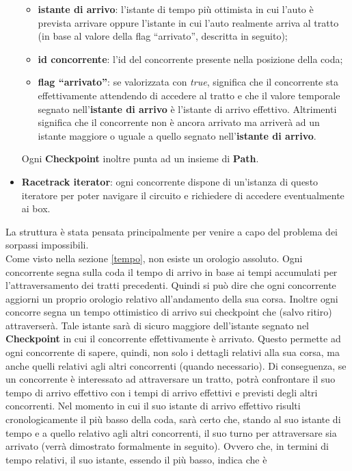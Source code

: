 \begin{itemize}
\begin{itemize}
\item \textbf{istante di arrivo}: l'istante di tempo più ottimista in cui l'auto
è prevista arrivare oppure l'istante in cui l'auto realmente
arriva al tratto (in base al valore della flag ``arrivato'', descritta in
seguito);
\item \textbf{id concorrente}: l'id del concorrente presente nella posizione
della coda;
\item \textbf{flag ``arrivato''}: se valorizzata con \emph{true}, significa che
il concorrente sta effettivamente attendendo di accedere al tratto
e che il valore temporale segnato nell'\textbf{istante di arrivo} è l'istante di
arrivo effettivo. Altrimenti significa che il concorrente non
è ancora arrivato ma arriverà ad un istante maggiore o uguale a quello segnato
nell'\textbf{istante di arrivo}.
\end{itemize}
Ogni \textbf{Checkpoint} inoltre punta ad un insieme di \textbf{Path}.
\item \textbf{Racetrack iterator}: ogni concorrente dispone di un'istanza di
questo iteratore per poter navigare il circuito e richiedere
di accedere eventualmente ai box.
\end{itemize}
La struttura è stata pensata principalmente per venire a capo del problema dei
sorpassi impossibili.\\
Come visto nella sezione \ref{tempo}, non esiste un orologio assoluto. Ogni
concorrente segna sulla
coda il tempo di arrivo in base ai tempi accumulati per l'attraversamento dei
tratti precedenti. Quindi si può dire che ogni
concorrente aggiorni un proprio orologio relativo all'andamento della sua corsa.
Inoltre ogni concorre segna
un tempo ottimistico di arrivo sui checkpoint che (salvo ritiro) attraverserà.
Tale istante sarà di sicuro maggiore dell'istante segnato
nel \textbf{Checkpoint} in cui il concorrente effettivamente è arrivato. Questo
permette ad ogni concorrente di sapere, quindi, non solo
i dettagli relativi alla sua corsa, ma anche quelli relativi agli altri
concorrenti (quando necessario). Di conseguenza, se un concorrente
è interessato ad attraversare un tratto, potrà confrontare il suo tempo di
arrivo effettivo con i tempi di arrivo effettivi e previsti
degli altri concorrenti. Nel momento in cui il suo istante di arrivo effettivo
risulti cronologicamente il più basso della coda, sarà certo
che, stando al suo istante di tempo e a quello relativo agli altri concorrenti,
il suo turno per attraversare sia arrivato (verrà dimostrato formalmente in seguito). Ovvero che, in 
termini di tempo relativi, il suo istante, essendo il più basso, indica che è
